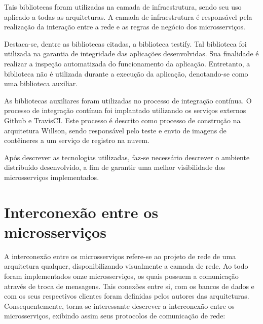 Tais bibliotecas foram utilizadas na camada de infraestrutura, sendo seu uso aplicado a todas as arquiteturas.
%
A camada de infraestrutura é responsável pela realização da interação entre a rede e as regras de negócio dos microsserviços.


Destaca-se, dentre as bibliotecas citadas, a biblioteca testify.
%
Tal biblioteca foi utilizada na garantia de integridade das aplicações desenvolvidas.
%
Sua finalidade é realizar a inspeção automatizada do funcionamento da aplicação.
%
Entretanto, a biblioteca não é utilizada durante a execução da aplicação, denotando-se como uma biblioteca auxiliar.



As bibliotecas auxiliares foram utilizadas no processo de integração contínua.
%
O processo de integração contínua foi implantado utilizando os serviços externos Github e TravisCI.
%
Este processo é descrito como processo de construção na arquitetura Willson, sendo responsável pelo teste e envio de imagens de contêineres a um serviço de registro na nuvem.




Após descrever as tecnologias utilizadas, faz-se necessário descrever o ambiente distribuído desenvolvido, a fim de garantir uma melhor visibilidade dos microsserviços implementados. %



\section{Interconexão entre os microsserviços}
\label{sec:interconexao}



A interconexão entre os microsserviços refere-se ao projeto de rede de uma arquitetura qualquer, disponibilizando visualmente a camada de rede.
%
Ao todo foram implementados onze microsserviços, os quais possuem a comunicação através de troca de mensagens.
%
Tais conexões entre si, com os bancos de dados e com os seus respectivos clientes foram definidas pelos autores das arquiteturas.
%
Consequentemente, torna-se interessante descrever a interconexão entre os microsserviços, exibindo assim seus protocolos de comunicação de rede:


